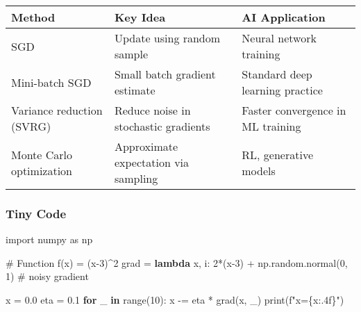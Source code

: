 \documentclass[
  letterpaper,
  DIV=11,
  numbers=noendperiod]{scrreprt}
\newenvironment{Shaded}{\begin{snugshade}}{\end{snugshade}}
\newcommand{\BuiltInTok}[1]{\textcolor[rgb]{0.00,0.23,0.31}{#1}}
\newcommand{\CommentTok}[1]{\textcolor[rgb]{0.37,0.37,0.37}{#1}}
\newcommand{\ControlFlowTok}[1]{\textcolor[rgb]{0.00,0.23,0.31}{\textbf{#1}}}
\newcommand{\DecValTok}[1]{\textcolor[rgb]{0.68,0.00,0.00}{#1}}
\newcommand{\FloatTok}[1]{\textcolor[rgb]{0.68,0.00,0.00}{#1}}
\newcommand{\ImportTok}[1]{\textcolor[rgb]{0.00,0.46,0.62}{#1}}
\newcommand{\KeywordTok}[1]{\textcolor[rgb]{0.00,0.23,0.31}{\textbf{#1}}}
\newcommand{\NormalTok}[1]{\textcolor[rgb]{0.00,0.23,0.31}{#1}}
\newcommand{\OperatorTok}[1]{\textcolor[rgb]{0.37,0.37,0.37}{#1}}
\newcommand{\SpecialCharTok}[1]{\textcolor[rgb]{0.37,0.37,0.37}{#1}}
\newcommand{\SpecialStringTok}[1]{\textcolor[rgb]{0.13,0.47,0.30}{#1}}
\begin{document}
\begin{longtable}[]{@{}
  >{\raggedright\arraybackslash}p{}
  >{\raggedright\arraybackslash}p{}
  >{\raggedright\arraybackslash}p{}@{}}
\toprule\noalign{}
\begin{minipage}[b]{\linewidth}\raggedright
Method
\end{minipage} & \begin{minipage}[b]{\linewidth}\raggedright
Key Idea
\end{minipage} & \begin{minipage}[b]{\linewidth}\raggedright
AI Application
\end{minipage} \\
\midrule\noalign{}
\endhead
\bottomrule\noalign{}
\endlastfoot
SGD & Update using random sample & Neural network training \\
Mini-batch SGD & Small batch gradient estimate & Standard deep learning
practice \\
Variance reduction (SVRG) & Reduce noise in stochastic gradients &
Faster convergence in ML training \\
Monte Carlo optimization & Approximate expectation via sampling & RL,
generative models \\
\end{longtable}

\subsubsection{Tiny Code}\label{tiny-code-147}

\begin{Shaded}
\begin{Highlighting}[]
\ImportTok{import}\NormalTok{ numpy }\ImportTok{as}\NormalTok{ np}

\CommentTok{\# Function f(x) = (x{-}3)\^{}2}
\NormalTok{grad }\OperatorTok{=} \KeywordTok{lambda}\NormalTok{ x, i: }\DecValTok{2}\OperatorTok{*}\NormalTok{(x}\OperatorTok{{-}}\DecValTok{3}\NormalTok{) }\OperatorTok{+}\NormalTok{ np.random.normal(}\DecValTok{0}\NormalTok{, }\DecValTok{1}\NormalTok{)  }\CommentTok{\# noisy gradient}

\NormalTok{x }\OperatorTok{=} \FloatTok{0.0}
\NormalTok{eta }\OperatorTok{=} \FloatTok{0.1}
\ControlFlowTok{for}\NormalTok{ \_ }\KeywordTok{in} \BuiltInTok{range}\NormalTok{(}\DecValTok{10}\NormalTok{):}
\NormalTok{    x }\OperatorTok{{-}=}\NormalTok{ eta }\OperatorTok{*}\NormalTok{ grad(x, \_)}
    \BuiltInTok{print}\NormalTok{(}\SpecialStringTok{f"x=}\SpecialCharTok{\{}\NormalTok{x}\SpecialCharTok{:.4f\}}\SpecialStringTok{"}\NormalTok{)}
\end{Highlighting}
\end{Shaded}
\end{document}
